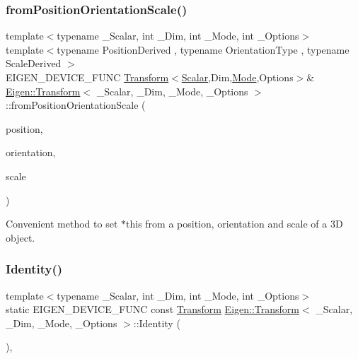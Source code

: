 \subsubsection{\texorpdfstring{fromPositionOrientationScale()}{fromPositionOrientationScale()}}
{\footnotesize\ttfamily template$<$typename \+\_\+\+Scalar, int \+\_\+\+Dim, int \+\_\+\+Mode, int \+\_\+\+Options$>$ \\
template$<$typename Position\+Derived , typename Orientation\+Type , typename Scale\+Derived $>$ \\
E\+I\+G\+E\+N\+\_\+\+D\+E\+V\+I\+C\+E\+\_\+\+F\+U\+NC \mbox{\hyperlink{class_eigen_1_1_transform}{Transform}}$<$\mbox{\hyperlink{class_eigen_1_1_transform_a4e69ced9d651745b8ed4eda46f41795d}{Scalar}},Dim,\mbox{\hyperlink{struct_mode}{Mode}},Options$>$\& \mbox{\hyperlink{class_eigen_1_1_transform}{Eigen\+::\+Transform}}$<$ \+\_\+\+Scalar, \+\_\+\+Dim, \+\_\+\+Mode, \+\_\+\+Options $>$\+::from\+Position\+Orientation\+Scale (\begin{DoxyParamCaption}\item[{const \mbox{\hyperlink{class_eigen_1_1_matrix_base}{Matrix\+Base}}$<$ Position\+Derived $>$ \&}]{position,  }\item[{const Orientation\+Type \&}]{orientation,  }\item[{const \mbox{\hyperlink{class_eigen_1_1_matrix_base}{Matrix\+Base}}$<$ Scale\+Derived $>$ \&}]{scale }\end{DoxyParamCaption})}

Convenient method to set {\ttfamily $\ast$this} from a position, orientation and scale of a 3D object. \mbox{\label{class_eigen_1_1_transform_a41e2e58b09790eb8e3e220acceb7de1f}} 
\subsubsection{\texorpdfstring{Identity()}{Identity()}}
{\footnotesize\ttfamily template$<$typename \+\_\+\+Scalar, int \+\_\+\+Dim, int \+\_\+\+Mode, int \+\_\+\+Options$>$ \\
static E\+I\+G\+E\+N\+\_\+\+D\+E\+V\+I\+C\+E\+\_\+\+F\+U\+NC const \mbox{\hyperlink{class_eigen_1_1_transform}{Transform}} \mbox{\hyperlink{class_eigen_1_1_transform}{Eigen\+::\+Transform}}$<$ \+\_\+\+Scalar, \+\_\+\+Dim, \+\_\+\+Mode, \+\_\+\+Options $>$\+::Identity (\begin{DoxyParamCaption}{ }\end{DoxyParamCaption})\hspace{0.3cm}{\ttfamily [inline]}, {\ttfamily [static]}}



